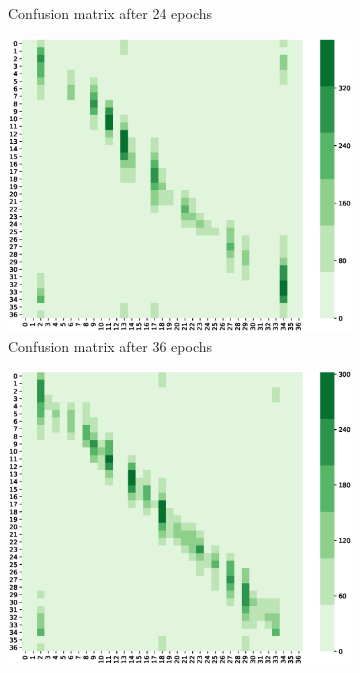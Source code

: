 \begin{figure}
\begin{subfigure}[t]{0.49\textwidth}
         \caption{Confusion matrix after 24 epochs}
         \label{fig:imgb}   
    \end{subfigure}
    \begin{subfigure}[t]{0.49\textwidth} 
        \includegraphics[width=\textwidth]{Figures/confusion-matrix/ckpt-30757.eps}
        \caption{Confusion matrix after 36 epochs}
        \label{fig:imgc}   
   \end{subfigure}
   \begin{subfigure}[t]{0.49\textwidth} 
    \includegraphics[width=\textwidth]{Figures/confusion-matrix/ckpt-40884.eps}

\end{subfigure}
\end{figure}
